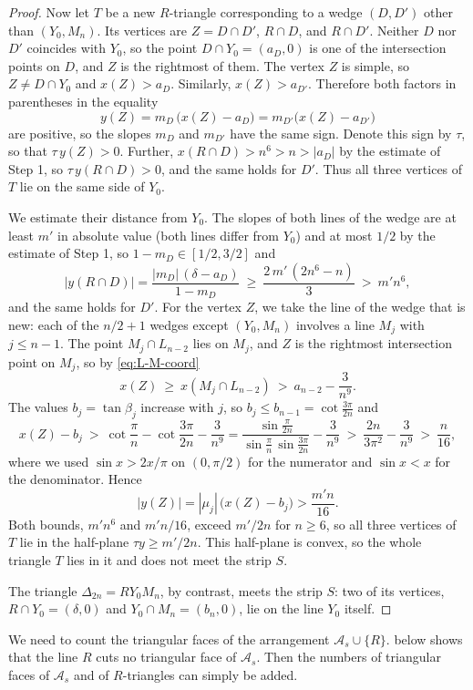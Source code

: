 \begin{proof}
Now let $T$ be a new $R$-triangle corresponding to a wedge $(D,D')$ other than $(Y_0,M_n)$. Its vertices are $Z=D\cap D'$, $R\cap D$, and $R\cap D'$.
Neither $D$ nor $D'$ coincides with $Y_0$, so the point $D\cap Y_0=(a_D,0)$ is one of the intersection points on $D$, and $Z$ is the rightmost of them. The vertex $Z$ is simple, so $Z\neq D\cap Y_0$ and $x(Z)>a_D$.
Similarly, $x(Z)>a_{D'}$.
Therefore both factors in parentheses in the equality
\[
y(Z)=m_D\,\bigl(x(Z)-a_D\bigr)=m_{D'}\bigl(x(Z)-a_{D'}\bigr)
\]
are positive, so the slopes $m_D$ and $m_{D'}$ have the same sign.
Denote this sign by $\tau$, so that $\tau\,y(Z)>0$.
Further, $x(R\cap D)>n^6>n>|a_D|$ by the estimate of Step 1, so $\tau\,y(R\cap D)>0$, and the same holds for $D'$.
Thus all three vertices of $T$ lie on the same side of $Y_0$.

We estimate their distance from $Y_0$.
The slopes of both lines of the wedge are at least $m'$ in absolute value (both lines differ from $Y_0$) and at most $1/2$ by the estimate of Step 1, so $1-m_D\in[1/2,3/2]$ and
\[
\bigl|y(R\cap D)\bigr|=\frac{|m_D|\,(\delta-a_D)}{1-m_D}
\ \ge\ \frac{2\,m'\,(2n^6-n)}3\ >\ m'n^6 ,
\]
and the same holds for $D'$.
For the vertex $Z$, we take the line of the wedge that is new: each of the $n/2+1$ wedges except $(Y_0,M_n)$ involves a line $M_j$ with $j\le n-1$.
The point $M_j\cap L_{n-2}$ lies on $M_j$, and $Z$ is the rightmost intersection point on $M_j$, so by \eqref{eq:L-M-coord}
\[
x(Z)\ \ge\ x(M_j\cap L_{n-2})\ >\ a_{n-2}-\frac3{n^9} .
\]
The values $b_j=\tan\beta_j$ increase with $j$, so $b_j\le b_{n-1}=\cot\frac{3\pi}{2n}$ and
\[
x(Z)-b_j\ >\ \cot\frac\pi n-\cot\frac{3\pi}{2n}-\frac3{n^9}
=\frac{\sin\frac\pi{2n}}{\sin\frac\pi n\,\sin\frac{3\pi}{2n}}-\frac3{n^9}
\ >\ \frac{2n}{3\pi^2}-\frac3{n^9}\ >\ \frac n{16} ,
\]
where we used $\sin x>2x/\pi$ on $(0,\pi/2)$ for the numerator and $\sin x<x$ for the denominator.
Hence
\[
|y(Z)|=|\mu_j|\,\bigl(x(Z)-b_j\bigr)>\frac{m'n}{16} .
\]
Both bounds, $m'n^6$ and $m'n/16$, exceed $m'/2n$ for $n\ge6$, so all three vertices of $T$ lie in the half-plane $\tau y\ge m'/2n$. This half-plane is convex, so the whole triangle $T$ lies in it and does not meet the strip $S$.

The triangle $\Delta_{2n}=RY_0M_n$, by contrast, meets the strip $S$: two of its vertices, $R\cap Y_0=(\delta,0)$ and $Y_0\cap M_n=(b_n,0)$, lie on the line $Y_0$ itself.
\end{proof}

We need to count the triangular faces of the arrangement $\mathcal A_s\cup\{R\}$.
 below shows that the line $R$ cuts no triangular face of $\mathcal A_s$.
Then the numbers of triangular faces of $\mathcal A_s$ and of $R$-triangles can simply be added.

